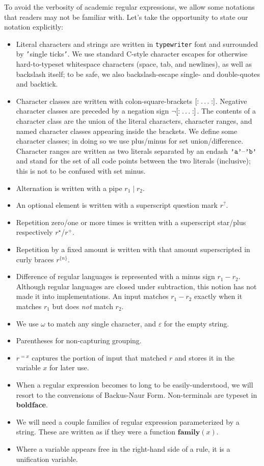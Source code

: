 \documentclass[11pt]{article} %
\begin{document}
To avoid the verbosity of academic regular expressions, we allow some notations that readers may not be familiar with.
Let's take the opportunity to state our notation explicitly:
\begin{itemize}
  \item Literal characters and strings are written in \texttt{typewriter} font and surrounded by \texttt{'}single ticks\texttt{'}.
        We use standard C-style character escapes for otherwise hard-to-typeset whitespace characters (space, tab, and newlines), as well as backslash itself; to be safe, we also backslash-escape single- and double-quotes and backtick.
  \item Character classes are written with colon-square-brackets $\mathopen{[\mathord:\;} \ldots \mathclose{\;\mathord:]}$.
        Negative character classes are preceded by a negation sign $\mathopen{\lnot[\mathord:\;} \ldots \mathclose{\;\mathord:]}$.
        The contents of a character class are the union of the literal characters, character ranges, and named character classes appearing inside the brackets.
        We define some character classes; in doing so we use plus/minus for set union/difference.
        Character ranges are written as two literals separated by an endash $\texttt{'{a}'}\text{--}\texttt{'{b}'}$ and stand for the set of all code points between the two literals (inclusive); this is not to be confused with set minus.
  \item Alternation is written with a pipe $r_1 \mid r_2$.
  \item An optional element is written with a superscript question mark $r^?$.
  \item Repetition zero/one or more times is written with a superscript star/plus respectively $r^\star$/$r^+$.
  \item Repetition by a fixed amount is written with that amount superscripted in curly braces $r^{\{n\}}$.
  \item Difference of regular languages is represented with a minus sign $r_1 - r_2$.
        Although regular languages are closed under subtraction, this notion has not made it into implementations.
        An input matches $r_1 - r_2$ exactly when it matches $r_1$ but does \emph{not} match $r_2$.
  \item We use $\omega$ to match any single character, and $\varepsilon$ for the empty string.
  \item Parentheses for non-capturing grouping.
  \item $r^{=x}$ captures the portion of input that matched $r$ and stores it in the variable $x$ for later use.
  \item When a regular expression becomes to long to be easily-understood, we will resort to the convensions of Backus-Naur Form.
        Non-terminals are typeset in \textbf{boldface}.
  \item We will need a couple families of regular expression parameterized by a string.
        These are written as if they were a function $\mathbf{family}(x)$.
  \item Where a variable appears free in the right-hand side of a rule, it is a unification variable.
\end{itemize}
\end{document}
